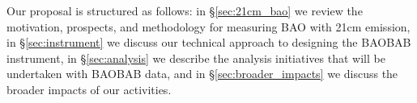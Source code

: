 \documentclass[12pt]{amsart}
\begin{document}


 











Our proposal is structured as follows: 
in \S\ref{sec:21cm_bao} we review the motivation, prospects, and methodology for measuring BAO with 21cm emission,
in \S\ref{sec:instrument} we discuss our technical approach to designing the BAOBAB instrument,
in \S\ref{sec:analysis} we describe the analysis initiatives that will be undertaken with BAOBAB data,
and in \S\ref{sec:broader_impacts} we discuss the broader impacts of our activities.

\vspace{-.2in}
\end{document}
